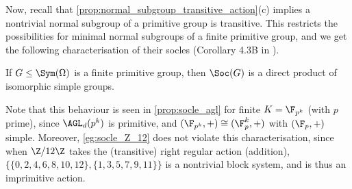 Now, recall that \autoref{prop:normal_subgroup_transitive_action}(c) implies a nontrivial normal subgroup of a primitive group is transitive. This restricts the possibilities for minimal normal subgroups of a finite primitive group, and we get the following characterisation of their socles (Corollary 4.3B in \cite{dixon_mortimer_perm_groups1996}).

\begin{theorem}\label{thm:socle_is_direct_product}
    If $G \leq \Sym(\Omega)$ is a finite primitive group, then $\Soc(G)$ is a direct product of isomorphic simple groups.
\end{theorem}

Note that this behaviour is seen in \autoref{prop:socle_agl} for finite $K = \F_{p^k}$ (with $p$ prime), since $\AGL_d(p^k)$ is primitive, and $(\F_{p^k},+) \cong (\F_p^k,+)$ with $(\F_p,+)$ simple. Moreover, \autoref{eg:socle_Z_12} does not violate this characterisation, since when $\Z/12\Z$ takes the (transitive) right regular action (addition), $\{\{0,2,4,6,8,10,12\},\{1,3,5,7,9,11\}\}$ is a nontrivial block system, and is thus an imprimitive action.

